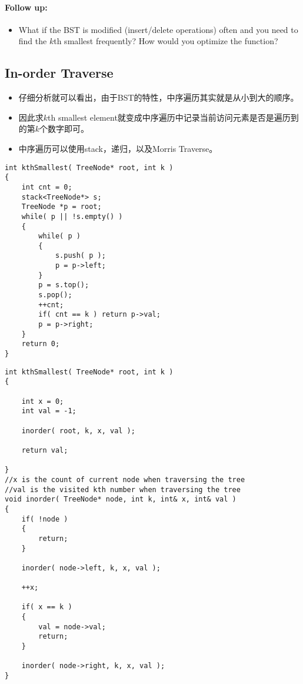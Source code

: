 \paragraph{Follow up:}
\begin{itemize}
\item What if the BST is modified (insert/delete operations) often and you need to find the $k$th smallest frequently? How would you optimize the function?
\end{itemize}
\subsection{In-order Traverse}

\begin{itemize}
\item 仔细分析就可以看出，由于BST的特性，中序遍历其实就是从小到大的顺序。
\item 因此求$k$th smallest element就变成中序遍历中记录当前访问元素是否是遍历到的第$k$个数字即可。
\item 中序遍历可以使用stack，递归，以及Morris Traverse。
\end{itemize}
\setcounter{lstlisting}{0}
\begin{lstlisting}[style=customc, caption={Stack Based In-order Traverse}]
int kthSmallest( TreeNode* root, int k )
{
    int cnt = 0;
    stack<TreeNode*> s;
    TreeNode *p = root;
    while( p || !s.empty() )
    {
        while( p )
        {
            s.push( p );
            p = p->left;
        }
        p = s.top();
        s.pop();
        ++cnt;
        if( cnt == k ) return p->val;
        p = p->right;
    }
    return 0;
}
\end{lstlisting}
\begin{lstlisting}[style=customc, caption={Recursion Based In-order Traverse}]
int kthSmallest( TreeNode* root, int k )
{

    int x = 0;
    int val = -1;

    inorder( root, k, x, val );

    return val;

}
//x is the count of current node when traversing the tree
//val is the visited kth number when traversing the tree
void inorder( TreeNode* node, int k, int& x, int& val )
{
    if( !node )
    {
        return;
    }

    inorder( node->left, k, x, val );

    ++x;

    if( x == k )
    {
        val = node->val;
        return;
    }

    inorder( node->right, k, x, val );
}
\end{lstlisting}
